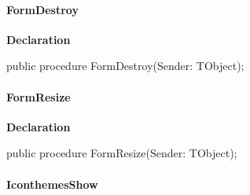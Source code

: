 \documentclass{report}
\newif\ifpdf
\begin{document}
\paragraph*{FormDestroy}\hspace*{\fill}

\label{thinstall.TisFrm-FormDestroy}
\begin{list}{}{
\setlength{\itemindent}{0cm}
\setlength{\listparindent}{0cm}
\setlength{\leftmargin}{\evensidemargin}
\addtolength{\leftmargin}{\tmplength}
\settowidth{\labelsep}{X}
\addtolength{\leftmargin}{\labelsep}
\setlength{\labelwidth}{\tmplength}
}
\item[\textbf{Declaration}\hfill]
\ifpdf
\begin{flushleft}
\fi
\begin{ttfamily}
public procedure FormDestroy(Sender: TObject);\end{ttfamily}

\ifpdf
\end{flushleft}
\fi

\end{list}
\paragraph*{FormResize}\hspace*{\fill}

\label{thinstall.TisFrm-FormResize}
\begin{list}{}{
\setlength{\itemindent}{0cm}
\setlength{\listparindent}{0cm}
\setlength{\leftmargin}{\evensidemargin}
\addtolength{\leftmargin}{\tmplength}
\settowidth{\labelsep}{X}
\addtolength{\leftmargin}{\labelsep}
\setlength{\labelwidth}{\tmplength}
}
\item[\textbf{Declaration}\hfill]
\ifpdf
\begin{flushleft}
\fi
\begin{ttfamily}
public procedure FormResize(Sender: TObject);\end{ttfamily}

\ifpdf
\end{flushleft}
\fi

\end{list}
\paragraph*{IconthemesShow}\hspace*{\fill}
\end{document}
